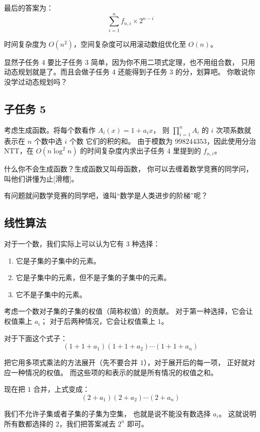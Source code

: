 \documentclass[UTF8]{article}
\begin{document}
	最后的答案为：
	$$
	\sum_{i = 1}^{n} f_{n, i} \times 2^{n - i}
	$$

	时间复杂度为 $O(n^2)$，空间复杂度可以用滚动数组优化至 $O(n)$。

	显然子任务 4 要比子任务 3 简单，因为你不用二项式定理，也不用组合数，
	只用动态规划就是了。而且会做子任务 4 还能得到子任务 3 的分，划算吧。
	你敢说你没学过动态规划吗？

	\subsection{子任务 5}

	考虑生成函数。将每个数看作 $A_i(x) = 1 + a_i x$，
	则 $\prod_{i = 1}^n A_i$ 的 $i$ 次项系数就表示在 $n$ 个数中选 $i$ 个数
	它们的积的和。
	由于模数为 $998244353$，因此使用分治 NTT，在 $O(n \log^2 n)$
	的时间复杂度内求出子任务 4 里提到的 $f_{n, i}$。

	什么你不会生成函数？生成函数又叫母函数，
	你可以去缠着数学竞赛的同学问，叫他们讲懂为止[滑稽]。

	有问题就问数学竞赛的同学吧，谁叫``数学是人类进步的阶梯''呢？

	\subsection{线性算法}

	对于一个数，我们实际上可以认为它有 $3$ 种选择：
	
	\begin{enumerate}
		\item 它是子集的子集中的元素。

		\item 它是子集中的元素，但不是子集的子集中的元素。

		\item 它不是子集中的元素。
	\end{enumerate}

	考虑一个数对子集的子集的权值（简称权值）的贡献。
	对于第一种选择，它会让权值乘上 $a_i$；
	对于后两种情况，它会让权值乘上 $1$。
	
	对于下面这个式子：
	$$
	(1 + 1 + a_1)(1 + 1 + a_2) \cdots (1 + 1 + a_n)
	$$
	
	把它用多项式乘法的方法展开（先不要合并 $1$），对于展开后的每一项，
	正好就对应一种情况的权值。
	而这些项的和表示的就是所有情况的权值之和。

	现在把 $1$ 合并，上式变成：
	$$
	(2 + a_1)(2 + a_2) \cdots (2 + a_n)
	$$

	我们不允许子集或者子集的子集为空集，
	也就是说不能没有数选择 $a_i$。
	这就说明所有数都选择的 $2$，我们把答案减去 $2^n$ 即可。
\end{document}
